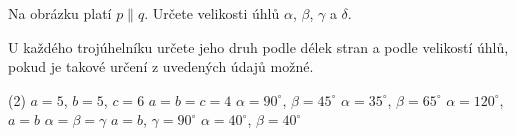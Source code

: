 \documentclass[12pt,a4paper]{article}
\begin{document}

\begin{exercise}

    Na obrázku platí $p\parallel q$. Určete velikosti úhlů
    $\alpha$, $\beta$, $\gamma$ a $\delta$.

    \begin{center}
    \end{center}

\end{exercise}



\setcounter{section}{2}


\begin{exercise}

    U každého trojúhelníku určete jeho druh podle délek stran a podle velikostí úhlů,
    pokud je takové určení z uvedených údajů možné.

    \begin{tasks}(2)
        \task $a=5$, $b=5$, $c=6$
        \task $a=b=c=4$
        \task $\alpha=90^\circ$, $\beta=45^\circ$
        \task $\alpha=35^\circ$, $\beta=65^\circ$
        \task $\alpha=120^\circ$, $a=b$
        \task $\alpha=\beta=\gamma$
        \task $a=b$, $\gamma=90^\circ$
        \task $\alpha=40^\circ$, $\beta=40^\circ$
    \end{tasks}

\end{exercise}
\end{document}
